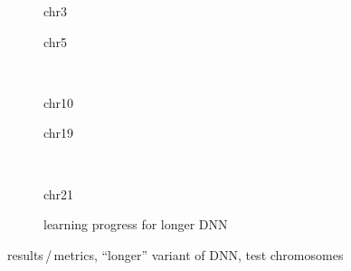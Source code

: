 \begin{figure}[p] %
    \begin{subfigure}{0.45\textwidth}
        \scriptsize
        \caption{chr3}
    \end{subfigure} \hfill
    \begin{subfigure}{0.45\textwidth}
        \scriptsize
        \caption{chr5}
    \end{subfigure}\\[5mm]
    \begin{subfigure}{0.45\textwidth}
        \scriptsize
        \caption{chr10}
    \end{subfigure}\hfill
    \begin{subfigure}{0.45\textwidth}
        \scriptsize
        \caption{chr19}
    \end{subfigure}\\[3mm]
    \centering
    \begin{subfigure}{0.45\textwidth}
        \scriptsize
        \caption{chr21}
    \end{subfigure}\hfill
    \begin{subfigure}{0.45\textwidth}
        \caption{learning progress for longer DNN} \label{fig:results:longerDNN_lossEpochs}
    \end{subfigure}
    \caption{results\,/\,metrics, ``longer'' variant of DNN,  test chromosomes}
    \label{fig:results:longerDNN_pearson}
\end{figure}
